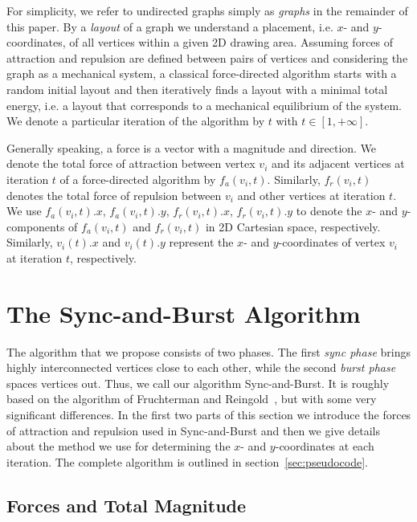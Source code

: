\documentclass{llncs}
\begin{document}
For simplicity, we refer to undirected graphs simply as \emph{graphs} in the remainder of this paper. By a \emph{layout} of a graph we understand a placement, i.e. $x$- and $y$-coordinates, of all vertices within a given 2D drawing area. Assuming forces of attraction and repulsion are defined between pairs of vertices and considering the graph as a mechanical system, a classical force-directed algorithm starts with a random initial layout and then iteratively finds a layout with a minimal total energy, i.e. a layout that corresponds to a mechanical equilibrium of the system. We denote a particular iteration of the algorithm by $t$ with $t \in [1, +\infty]$.

Generally speaking, a force is a vector with a magnitude and direction. We denote the total force of attraction between vertex $v_i$ and its adjacent vertices at iteration $t$ of a force-directed algorithm by $f_a(v_i, t)$. Similarly, $f_r(v_i, t)$ denotes the total force of repulsion between $v_i$ and other vertices at iteration $t$. We use $f_a(v_i,t).x$, $f_a(v_i,t).y$, $f_r(v_i,t).x$, $f_r(v_i,t).y$ to denote the $x$- and $y$-components of $f_a(v_i,t)$ and $f_r(v_i,t)$ in 2D Cartesian space, respectively. Similarly, $v_{i}(t).x$ and $v_{i}(t).y$ represent the $x$- and $y$-coordinates of vertex $v_i$ at iteration $t$, respectively. 

\section{The Sync-and-Burst Algorithm}\label{sec:algorithm}

The algorithm that we propose consists of two phases. The first \emph{sync phase} brings highly interconnected vertices close to each other, while the second \emph{burst phase} spaces vertices out. Thus, we call our algorithm Sync-and-Burst. It is roughly based on the algorithm of Fruchterman and Reingold~\cite{FruRei1991}, but with some very significant differences. In the first two parts of this section we introduce the forces of attraction and repulsion used in Sync-and-Burst and then we give details about the method we use for determining the $x$- and $y$-coordinates at each iteration. The complete algorithm is outlined in section~\ref{sec:pseudocode}.

\subsection{Forces and Total Magnitude}\label{subsec:algorithm:forces}
\end{document}

